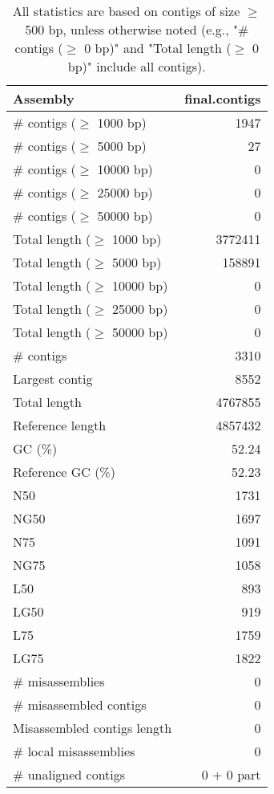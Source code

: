 \documentclass[12pt,a4paper]{article}
\begin{document}
\begin{table}[ht]
\begin{center}
\caption{All statistics are based on contigs of size $\geq$ 500 bp, unless otherwise noted (e.g., "\# contigs ($\geq$ 0 bp)" and "Total length ($\geq$ 0 bp)" include all contigs).}
\begin{tabular}{|l*{1}{|r}|}
\hline
Assembly & final.contigs \\ \hline
\# contigs ($\geq$ 1000 bp) & 1947 \\ \hline
\# contigs ($\geq$ 5000 bp) & 27 \\ \hline
\# contigs ($\geq$ 10000 bp) & 0 \\ \hline
\# contigs ($\geq$ 25000 bp) & 0 \\ \hline
\# contigs ($\geq$ 50000 bp) & 0 \\ \hline
Total length ($\geq$ 1000 bp) & 3772411 \\ \hline
Total length ($\geq$ 5000 bp) & 158891 \\ \hline
Total length ($\geq$ 10000 bp) & 0 \\ \hline
Total length ($\geq$ 25000 bp) & 0 \\ \hline
Total length ($\geq$ 50000 bp) & 0 \\ \hline
\# contigs & 3310 \\ \hline
Largest contig & 8552 \\ \hline
Total length & 4767855 \\ \hline
Reference length & 4857432 \\ \hline
GC (\%) & 52.24 \\ \hline
Reference GC (\%) & 52.23 \\ \hline
N50 & 1731 \\ \hline
NG50 & 1697 \\ \hline
N75 & 1091 \\ \hline
NG75 & 1058 \\ \hline
L50 & 893 \\ \hline
LG50 & 919 \\ \hline
L75 & 1759 \\ \hline
LG75 & 1822 \\ \hline
\# misassemblies & 0 \\ \hline
\# misassembled contigs & 0 \\ \hline
Misassembled contigs length & 0 \\ \hline
\# local misassemblies & 0 \\ \hline
\# unaligned contigs & 0 + 0 part \\ \hline

\end{tabular}
\end{center}
\end{table}
\end{document}
